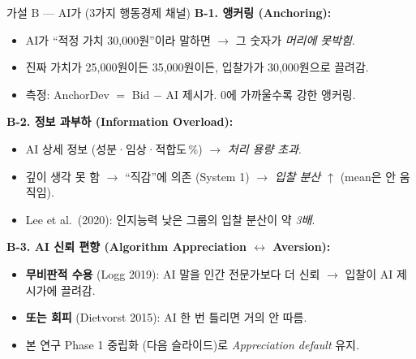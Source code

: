\documentclass[aspectratio=169]{beamer}
\begin{document}
\begin{frame}{가설 B --- AI가  (3가지 행동경제 채널)}
  \footnotesize
  \textbf{B-1. 앵커링 (Anchoring):}
  \begin{itemize}\itemsep0.05em
    \item AI가 ``적정 가치 30,000원''이라 말하면 $\rightarrow$ 그 숫자가 \emph{머리에 못박힘}.
    \item 진짜 가치가 25,000원이든 35,000원이든, 입찰가가 30,000원으로 끌려감.
    \item 측정: AnchorDev $=$ Bid $-$ AI 제시가. 0에 가까울수록 강한 앵커링.
  \end{itemize}

  \vspace{0.3em}
  \textbf{B-2. 정보 과부하 (Information Overload):}
  \begin{itemize}\itemsep0.05em
    \item AI 상세 정보 (성분·임상·적합도\,\%) $\rightarrow$ \emph{처리 용량 초과}.
    \item 깊이 생각 못 함 $\rightarrow$ ``직감''에 의존 (System 1) $\rightarrow$ \emph{입찰 분산 $\uparrow$} (mean은 안 움직임).
    \item Lee et al.\ (2020): 인지능력 낮은 그룹의 입찰 분산이 약 \emph{3배}.
  \end{itemize}

  \vspace{0.3em}
  \textbf{B-3. AI 신뢰 편향 (Algorithm Appreciation $\leftrightarrow$ Aversion):}
  \begin{itemize}\itemsep0.05em
    \item \textbf{무비판적 수용} (Logg 2019): AI 말을 인간 전문가보다 더 신뢰 $\rightarrow$ 입찰이 AI 제시가에 끌려감.
    \item \textbf{또는 회피} (Dietvorst 2015): AI 한 번 틀리면 거의 안 따름.
    \item 본 연구 Phase 1 중립화 (다음 슬라이드)로 \emph{Appreciation default} 유지.
  \end{itemize}

  \vspace{0.2em}
\end{frame}
\end{document}
